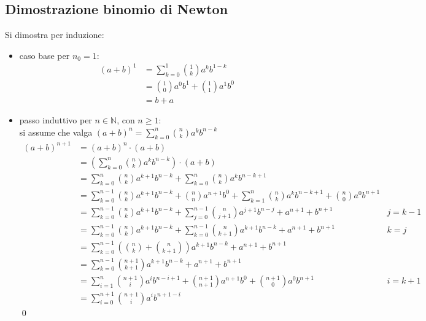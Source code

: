 \documentclass[a4paper]{article}
\begin{document}
\subsection{Dimostrazione binomio di Newton}
Si dimostra per induzione:
\begin{itemize}
	\item caso base per \(n_0 = 1\):
	\begin{align*}
		(a + b)^1 &= \sum_{k=0}^{1} \binom{1}{k} a^k b^{1-k} \\
		&= \binom{1}{0} a^0 b^1 + \binom{1}{1} a^1 b^0 \\
		&= b + a
	\end{align*}
	
	\item passo induttivo per \(n \in \mathbb{N}\), con \(n \geq 1\): \\
	si assume che valga \(\displaystyle (a + b)^n = \sum_{k=0}^{n} \binom{n}{k} a^k b^{n-k}\)
	\begin{align*}
		(a+b)^{n+1} &= (a+b)^n \cdot (a+b) \\
		&= \left(\sum_{k=0}^{n} \binom{n}{k} a^k b^{n-k}\right) \cdot (a+b) \\
		&= \sum_{k=0}^{n} \binom{n}{k} a^{k+1} b^{n-k} + \sum_{k=0}^{n} \binom{n}{k} a^k b^{n-k+1} \\
		&= \sum_{k=0}^{n-1} \binom{n}{k} a^{k+1} b^{n-k} + \binom{n}{n} a^{n+1} b^0 + \sum_{k=1}^{n} \binom{n}{k} a^k b^{n-k+1} + \binom{n}{0} a^0 b^{n+1} \\
		&= \sum_{k=0}^{n-1} \binom{n}{k} a^{k+1} b^{n-k} + \sum_{j=0}^{n-1} \binom{n}{j+1} a^{j+1} b^{n-j} + a^{n+1} + b^{n+1} &j = k-1 \\
		&= \sum_{k=0}^{n-1} \binom{n}{k} a^{k+1} b^{n-k} + \sum_{k=0}^{n-1} \binom{n}{k+1} a^{k+1} b^{n-k} + a^{n+1} + b^{n+1} &k = j \\
		&= \sum_{k=0}^{n-1} \left(\binom{n}{k} + \binom{n}{k+1}\right) a^{k+1} b^{n-k} + a^{n+1} + b^{n+1} \\
		&= \sum_{k=0}^{n-1} \binom{n+1}{k+1} a^{k+1} b^{n-k} + a^{n+1} + b^{n+1} \\
		&= \sum_{i=1}^{n} \binom{n+1}{i} a^i b^{n-i+1} + \binom{n+1}{n+1} a^{n+1} b^0 + \binom{n+1}{0} a^0 b^{n+1} & i = k+1 \\
		&= \sum_{i=0}^{n+1} \binom{n+1}{i} a^i b^{n+1-i}
	\end{align*}
	\qed
\end{itemize}

\newpage


\end{document}
